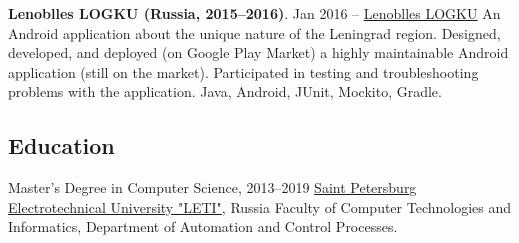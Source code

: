 \documentclass{vl}
\begin{document}
    \textbf{Lenoblles LOGKU (Russia, 2015--2016)}.
    Jan 2016 – \href{https://play.google.com/store/apps/details?id=com.altinntech.oopt_lo}{Lenoblles LOGKU}
    An Android application about the unique nature of the Leningrad region.
    Designed, developed, and deployed (on Google Play Market) a highly maintainable Android application
    (still on the market).
    Participated in testing and troubleshooting problems with the application.
    Java, Android, JUnit, Mockito, Gradle.

    \subsection*{Education}
    \begin{samepage}
        Master's Degree in Computer Science, 2013--2019\newline
        \href{https://etu.ru/en/university/}{Saint Petersburg Electrotechnical University "LETI"}, Russia\newline
        Faculty of Computer Technologies and Informatics, Department of Automation and Control Processes.
    \end{samepage}
\end{document}
